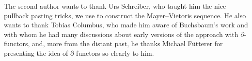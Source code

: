 
The second author wants to thank Urs Schreiber, who taught him the nice pullback pasting tricks, we use to construct the Mayer--Vietoris sequence.
He also wants to thank Tobias Columbus, who made him aware of Buchsbaum's work and with whom he had many discussions about early versions of the approach with $\partial$-functors,
and, more from the distant past, he thanks Michael Fütterer for presenting the idea of $\partial$-functors so clearly to him.
